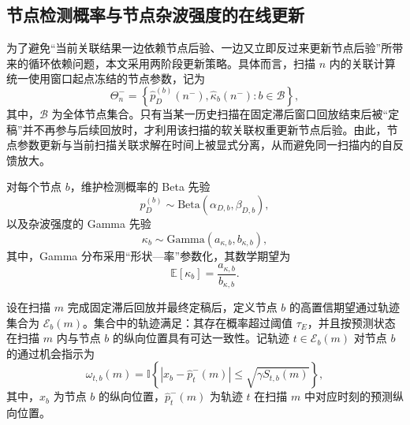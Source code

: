 \documentclass{xdupgthesis}
\begin{document}
\subsection{节点检测概率与节点杂波强度的在线更新}
\label{subsec:ch3_node_stats}

为了避免“当前关联结果一边依赖节点后验、一边又立即反过来更新节点后验”所带来的循环依赖问题，本文采用两阶段更新策略。具体而言，扫描 $n$ 内的关联计算统一使用窗口起点冻结的节点参数，记为
\begin{equation}
	\Theta_n^{-}=\left\{\hat p_D^{(b)}(n^-),\hat \kappa_b(n^-): b\in\mathcal B\right\},
	\label{eq:ch3_theta_frozen}
\end{equation}
其中，$\mathcal B$ 为全体节点集合。只有当某一历史扫描在固定滞后窗口回放结束后被“定稿”并不再参与后续回放时，才利用该扫描的软关联权重更新节点后验。由此，节点参数更新与当前扫描关联求解在时间上被显式分离，从而避免同一扫描内的自反馈放大。

对每个节点 $b$，维护检测概率的 Beta 先验
\begin{equation}
	p_D^{(b)}\sim \mathrm{Beta}(\alpha_{D,b},\beta_{D,b}),
	\label{eq:ch3_beta_prior_v2}
\end{equation}
以及杂波强度的 Gamma 先验
\begin{equation}
	\kappa_b\sim \mathrm{Gamma}(a_{\kappa,b},b_{\kappa,b}),
	\label{eq:ch3_gamma_prior_v2}
\end{equation}
其中，Gamma 分布采用“形状—率”参数化，其数学期望为
\begin{equation}
	\mathbb E[\kappa_b]=\frac{a_{\kappa,b}}{b_{\kappa,b}}.
	\label{eq:ch3_kappa_mean}
\end{equation}

设在扫描 $m$ 完成固定滞后回放并最终定稿后，定义节点 $b$ 的高置信期望通过轨迹集合为 $\mathcal E_b(m)$。集合中的轨迹满足：其存在概率超过阈值 $\tau_E$，并且按预测状态在扫描 $m$ 内与节点 $b$ 的纵向位置具有可达一致性。记轨迹 $t\in\mathcal E_b(m)$ 对节点 $b$ 的通过机会指示为
\begin{equation}
	\omega_{t,b}(m)=
	\mathbb I\left\{
	\left|x_b-\hat p_t^{-}(m)\right|\le \sqrt{\gamma S_{t,b}(m)}
	\right\},
	\label{eq:ch3_pass_indicator}
\end{equation}
其中，$x_b$ 为节点 $b$ 的纵向位置，$\hat p_t^{-}(m)$ 为轨迹 $t$ 在扫描 $m$ 中对应时刻的预测纵向位置。
\end{document}
